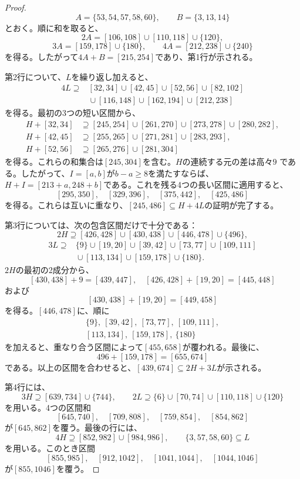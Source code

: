 \documentclass[12pt]{ltjsarticle}
\theoremstyle{plain}
\begin{document}
\begin{proof}
\[
 A=\{53,54,57,58,60\},\qquad B=\{3,13,14\}
\]
とおく。順に和を取ると、
\[
 2A=[106,108]\cup[110,118]\cup\{120\},
\]
\[
 3A=[159,178]\cup\{180\},\qquad
 4A=[212,238]\cup\{240\}
\]
を得る。したがって$4A+B=[215,254]$であり、第1行が示される。

第2行について、$L$を繰り返し加えると、
\[
\begin{split}
4L\supseteq{}&[32,34]\cup[42,45]\cup[52,56]\cup[82,102]\\
 &{}\cup[116,148]\cup[162,194]\cup[212,238]
\end{split}
\]
を得る。最初の3つの短い区間から、
\[
\begin{aligned}
H+[32,34]&\supseteq[245,254]\cup[261,270]
 \cup[273,278]\cup[280,282],\\
H+[42,45]&\supseteq[255,265]\cup[271,281]\cup[283,293],\\
H+[52,56]&\supseteq[265,276]\cup[281,304]
\end{aligned}
\]
を得る。これらの和集合は$[245,304]$を含む。$H$の連続する元の差は高々$9$
である。したがって、$I=[a,b]$が$b-a\geq8$を満たすならば、
$H+I=[213+a,248+b]$である。これを残る4つの長い区間に適用すると、
\[
 [295,350],\quad[329,396],\quad[375,442],\quad[425,486]
\]
を得る。これらは互いに重なり、$[245,486]\subseteq H+4L$の証明が完了する。

第3行については、次の包含区間だけで十分である：
\[
 2H\supseteq[426,428]\cup[430,438]\cup[446,478]\cup\{496\},
\]
\[
\begin{split}
3L\supseteq{}&\{9\}\cup[19,20]\cup[39,42]\cup[73,77]
 \cup[109,111]\\
 &{}\cup[113,134]\cup[159,178]\cup\{180\}.
\end{split}
\]
$2H$の最初の2成分から、
\[
 [430,438]+9=[439,447],\quad
 [426,428]+[19,20]=[445,448]
\]
および
\[
 [430,438]+[19,20]=[449,458]
\]
を得る。$[446,478]$に、順に
\[
\begin{gathered}
 \{9\},\ [39,42],\ [73,77],\ [109,111],\\
 [113,134],\ [159,178],\ \{180\}
\end{gathered}
\]
を加えると、重なり合う区間によって$[455,658]$が覆われる。最後に、
\[
 496+[159,178]=[655,674]
\]
である。以上の区間を合わせると、$[439,674]\subseteq2H+3L$が示される。

第4行には、
\[
 3H\supseteq[639,734]\cup\{744\},\qquad
 2L\supseteq\{6\}\cup[70,74]\cup[110,118]\cup\{120\}
\]
を用いる。4つの区間和
\[
 [645,740],\quad[709,808],\quad[759,854],\quad[854,862]
\]
が$[645,862]$を覆う。最後の行には、
\[
 4H\supseteq[852,982]\cup[984,986],
 \qquad \{3,57,58,60\}\subseteq L
\]
を用いる。このとき区間
\[
 [855,985],\quad[912,1042],\quad[1041,1044],\quad[1044,1046]
\]
が$[855,1046]$を覆う。
\end{proof}
\end{document}
